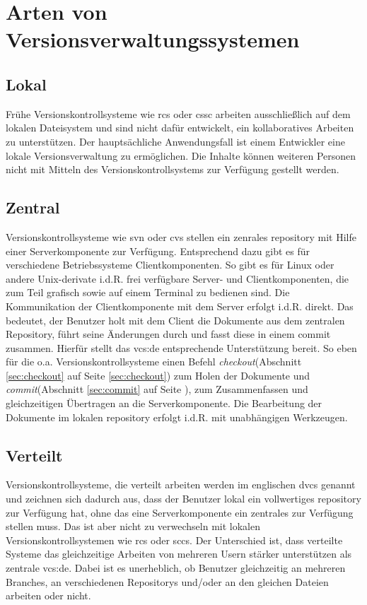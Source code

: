 \section{Arten von Versionsverwaltungssystemen}
\subsection{Lokal}\label{sec:local}
Frühe Versionskontrollsysteme wie \acrshort{rcs} oder \acrshort{cssc} arbeiten
ausschließlich auf dem lokalen Dateisystem und sind nicht dafür entwickelt, ein
kollaboratives Arbeiten zu unterstützen. Der hauptsächliche Anwendungsfall ist
einem Entwickler eine lokale Versionsverwaltung zu ermöglichen. Die Inhalte
können weiteren Personen nicht mit Mitteln des Versionskontrollsystems zur
Verfügung gestellt werden.

\subsection{Zentral}\label{sec:central}
Versionskontrollsysteme wie \acrshort{svn} oder \acrshort{cvs} stellen ein
zenrales \gls{repository} mit Hilfe einer Serverkomponente zur Verfügung.
Entsprechend dazu gibt es für verschiedene Betriebssysteme Clientkomponenten.
So gibt es für Linux oder andere Unix-derivate i.d.R. frei verfügbare Server-
und Clientkomponenten, die zum Teil grafisch sowie auf einem Terminal zu
bedienen sind. Die Kommunikation der Clientkomponente mit dem Server erfolgt
i.d.R. direkt. Das bedeutet, der Benutzer holt mit dem Client die Dokumente aus
dem zentralen Repository, führt seine Änderungen durch und fasst diese in einem
\gls{commit} zusammen. Hierfür stellt das \acrlong{vcs:de} entsprechende
Unterstützung bereit. So eben für die o.a. Versionskontrollsysteme einen Befehl
\textit{checkout}(Abschnitt \ref{sec:checkout} auf Seite \ref{sec:checkout})
zum Holen der Dokumente und \textit{commit}(Abschnitt \ref{sec:commit} auf
Seite \pageref{sec:commit}), zum Zusammenfassen und gleichzeitigen Übertragen
an die Serverkomponente. Die Bearbeitung der Dokumente im lokalen
\gls{repository} erfolgt i.d.R. mit unabhängigen
Werkzeugen.\cite[S.~38-40]{hagen:1678}

\subsection{Verteilt}\label{sec:decentral}
Versionskontrollsysteme, die verteilt arbeiten werden im englischen
\acrfull{dvcs} genannt und zeichnen sich dadurch aus, dass der Benutzer lokal
ein vollwertiges \gls{repository} zur Verfügung hat, ohne das eine
Serverkomponente ein zentrales zur Verfügung stellen muss. Das ist aber nicht
zu verwechseln mit lokalen Versionskontrollsystemen wie \acrshort{rcs} oder
\acrshort{sccs}. Der Unterschied ist, dass verteilte Systeme das gleichzeitige
Arbeiten von mehreren Usern stärker unterstützen als zentrale
\acrshort{vcs:de}. Dabei ist es unerheblich, ob Benutzer gleichzeitig an
mehreren Branches, an verschiedenen Repositorys und/oder an den gleichen
Dateien arbeiten oder nicht.\cite[S.~393-394]{cd}

